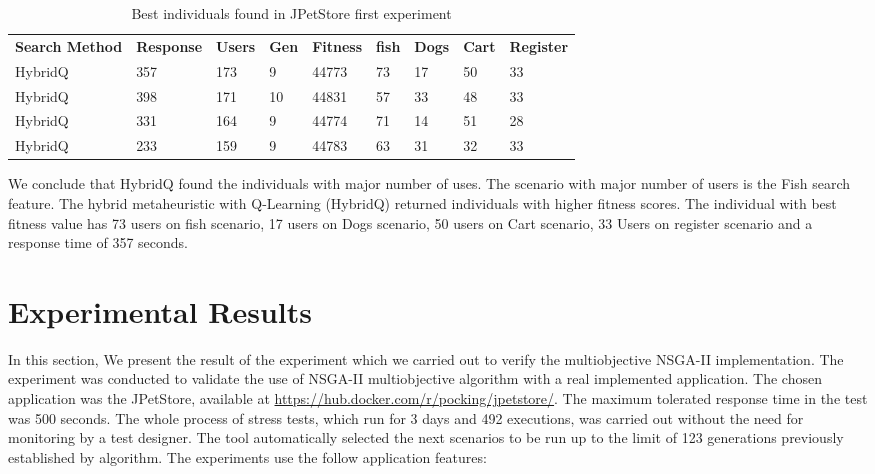 \begin{table}[h!]
\centering
\caption{Best individuals found in JPetStore first experiment}
\label{tab:bestindividuals3}
\begin{tabular}{lllllllll}
\rowcolor[HTML]{C0C0C0} 
\textbf{Search Method} & \textbf{Response} & \textbf{Users} & \textbf{Gen} & \textbf{Fitness} & \textbf{fish} & \textbf{Dogs} & \textbf{Cart} & \textbf{Register} \\
HybridQ                & 357               & 173            & 9            & 44773            & 73             & 17            & 50            & 33                \\
HybridQ                & 398               & 171            & 10           & 44831            & 57             & 33            & 48            & 33                \\
HybridQ                & 331               & 164            & 9            & 44774            & 71             & 14            & 51            & 28                \\
HybridQ                & 233               & 159            & 9            & 44783            & 63             & 31            & 32            & 33               
\end{tabular}
\end{table}

We conclude that HybridQ found the individuals with major number of uses. The scenario with major number of users is the Fish search feature. The hybrid metaheuristic with Q-Learning (HybridQ) returned individuals with higher fitness scores.  The individual with best fitness value has 73 users on fish scenario, 17 users on Dogs scenario, 50 users on Cart scenario, 33 Users on register scenario  and a response time of 357 seconds. 


\section{Experimental Results}

In this section, We present the result of the experiment which we carried out to verify the multiobjective NSGA-II   implementation. The experiment was conducted to validate the use of NSGA-II multiobjective algorithm with a real implemented application. The chosen application was the JPetStore, available at \url{https://hub.docker.com/r/pocking/jpetstore/}. The maximum tolerated response time in the test was 500 seconds.  The whole process of stress  tests, which run for 3 days and 492 executions, was carried out without the need for monitoring by a test designer. The tool automatically selected the next scenarios to be run up to the limit of 123 generations previously established by algorithm. The experiments use the follow application features:


